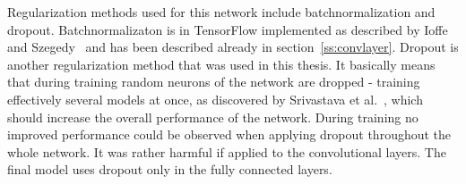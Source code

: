 \documentclass[main.tex]{subfiles}
\begin{document}
Regularization methods used for this network include batchnormalization and dropout. Batchnormalizaton is in TensorFlow implemented as described by Ioffe and Szegedy~\cite{ioffe2015batch} and has been described already in section~\ref{ss:convlayer}. Dropout is another regularization method that was used in this thesis. It basically means that during training random neurons of the network are dropped - training effectively several models at once, as discovered by Srivastava et al.~\cite{srivastava2014dropout}, which should increase the overall performance of the network. During training no improved performance could be observed when applying dropout throughout the whole network. It was rather harmful if applied to the convolutional layers. The final model uses dropout only in the fully connected  layers.
\end{document}
